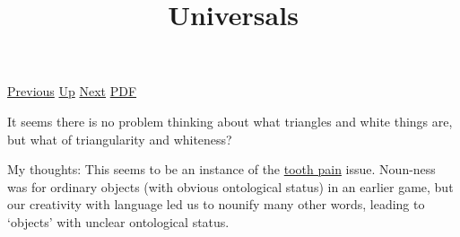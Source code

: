 \documentclass[12pt,a4paper]{report}
\begin{document}
 \href{doc/phil/PhilProblems/BradleysProblem.html}{Previous} 
 \href{doc/phil/PhilProblems.html}{Up} 
 \href{doc/phil/PhilProblems/WhattheTortoiseSaidtoAchilles.html}{Next} 
 \href{doc/phil/PhilProblems/Universals.pdf}{PDF} 
\title{Universals}
It seems there is no problem thinking about what triangles and white things are, but what of triangularity and whiteness?

My thoughts: This seems to be an instance of the \href{doc/phil/PhilSituations/ToothPain}{tooth pain} issue. Noun-ness was for ordinary objects (with obvious ontological status) in an earlier game, but our creativity with language led us to nounify many other words, leading to `objects' with unclear ontological status.
\end{document}
